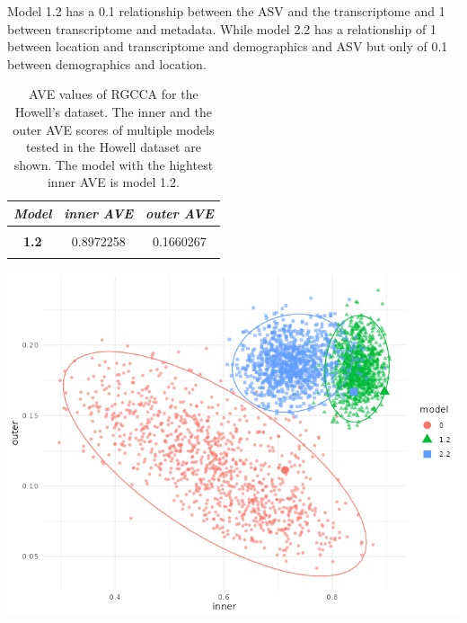 \documentclass[
  12pt,
  a4paper,
  twoside,
  openright]{book}
\let\origfigure\figure
\let\endorigfigure\endfigure
\renewenvironment{figure}[1][2] {
    \expandafter\origfigure\expandafter[!htp]
} {
    \endorigfigure
}
\begin{document}
Model 1.2 has a 0.1 relationship between the ASV and the transcriptome and 1 between transcriptome and metadata.
While model 2.2 has a relationship of 1 between location and transcriptome and demographics and ASV but only of 0.1 between demographics and location.

\begin{table}[H]

\caption[AVE values of RGCCA for the Howell's dataset.]{\label{tab:howell-models-ave}AVE values of RGCCA for the Howell's dataset. The inner and the outer AVE scores of multiple models tested in the Howell dataset are shown. The model with the hightest inner AVE is model 1.2.}
\centering
\begin{tabular}[t]{|>{}c|c|>{}c|}
\hline
\em{\textbf{Model}} & \em{\textbf{inner AVE}} & \em{\textbf{outer AVE}}\\
\hline
\textbf{\cellcolor{gray!6}{0.0}} & \cellcolor{gray!6}{0.7180980} & \cellcolor{gray!6}{0.1112390}\\
\hline
\textbf{1.2} & 0.8972258 & 0.1660267\\
\hline
\textbf{\cellcolor{gray!6}{2.2}} & \cellcolor{gray!6}{0.8433274} & \cellcolor{gray!6}{0.1659844}\\
\hline
\end{tabular}
\end{table}

\begin{figure}
\includegraphics[width=1\linewidth]{images/howells_models_bootstrap} \caption[Bootstrap of models in Howell's datset.]{Bootstrap of models in Howell's datset. Bootstrap of the different models on the inner and outer AVE: Model 0 has just trancriptomic and microbiome data, model 1.2 has transcriptomic, microbiome and sample data and model 2.2 has transcriptomic, microbiome and sample data split in different blocks. The bigger points are the models on the original dataset.}\label{fig:howell-bootstrap}
\end{figure}
\end{document}
